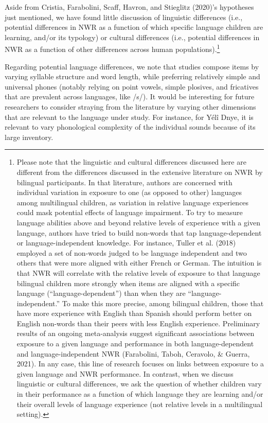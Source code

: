 \documentclass[
  english,
  ,man,floatsintext]{apa6}
\begin{document}
Aside from Cristia, Farabolini, Scaff, Havron, and Stieglitz (2020)'s hypotheses just mentioned, we have found little discussion of linguistic differences (i.e., potential differences in NWR as a function of which specific language children are learning, and/or its typology) or cultural differences (i.e., potential differences in NWR as a function of other differences across human populations).\footnote{Please note that the linguistic and cultural differences discussed here are different from the differences discussed in the extensive literature on NWR by bilingual participants. In that literature, authors are concerned with individual variation in exposure to one (as opposed to other) languages among multilingual children, as variation in relative language experiences could mask potential effects of language impairment. To try to measure language abilities above and beyond relative levels of experience with a given language, authors have tried to build non-words that tap language-dependent or language-independent knowledge. For instance, Tuller et al. (2018) employed a set of non-words judged to be language independent and two others that were more aligned with either French or German. The intuition is that NWR will correlate with the relative levels of exposure to that language bilingual children more strongly when items are aligned with a specific language (``language-dependent'') than when they are ``language-independent.'' To make this more precise, among bilingual children, those that have more experience with English than Spanish should perform better on English non-words than their peers with less English experience. Preliminary results of an ongoing meta-analysis suggest significant associations between exposure to a given language and performance in both language-dependent and language-independent NWR (Farabolini, Taboh, Ceravolo, \& Guerra, 2021). In any case, this line of research focuses on links between exposure to a given language and NWR performance. In contrast, when we discuss linguistic or cultural differences, we ask the question of whether children vary in their performance as a function of which language they are learning and/or their overall levels of language experience (not relative levels in a multilingual setting).}

Regarding potential language differences, we note that studies compose items by varying syllable structure and word length, while preferring relatively simple and universal phones (notably relying on point vowels, simple plosives, and fricatives that are prevalent across languages, like /s/). It would be interesting for future researchers to consider straying from the literature by varying other dimensions that are relevant to the language under study. For instance, for Yélî Dnye, it is relevant to vary phonological complexity of the individual sounds because of its large inventory.
\end{document}
